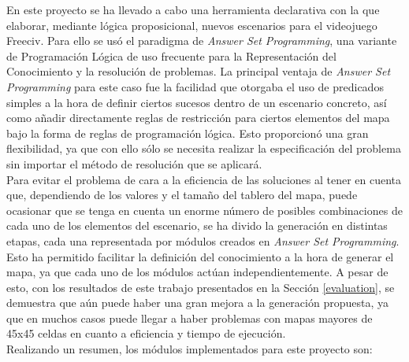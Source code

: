 En este proyecto se ha llevado a cabo una herramienta declarativa con la que elaborar, mediante lógica proposicional, nuevos escenarios para el videojuego Freeciv. Para ello se usó el paradigma de \textit{Answer Set Programming}, una variante de Programación Lógica de uso frecuente para la Representación del Conocimiento y la resolución de problemas. La principal ventaja de \textit{Answer Set Programming} para este caso fue la facilidad que otorgaba el uso de predicados simples a la hora de definir ciertos sucesos dentro de un escenario concreto, así como añadir directamente reglas de restricción para ciertos elementos del mapa bajo la forma de reglas de programación lógica. Esto proporcionó una gran flexibilidad, ya que con ello sólo se necesita realizar la especificación del problema sin importar el método de resolución que se aplicará. \\

Para evitar el problema de cara a la eficiencia de las soluciones al tener en cuenta que, dependiendo de los valores y el tamaño del tablero del mapa, puede ocasionar que se tenga en cuenta un enorme número de posibles combinaciones de cada uno de los elementos del escenario, se ha divido la generación en distintas etapas, cada una representada por módulos creados en \textit{Answer Set Programming}. Esto ha permitido facilitar la definición del conocimiento a la hora de generar el mapa, ya que cada uno de los módulos actúan independientemente. A pesar de esto, con los resultados de este trabajo presentados en la Sección \ref{evaluation}, se demuestra que aún puede haber una gran mejora a la generación propuesta, ya que en muchos casos puede llegar a haber problemas con mapas mayores de 45x45 celdas en cuanto a eficiencia y tiempo de ejecución. \\

Realizando un resumen, los módulos implementados para este proyecto son:

